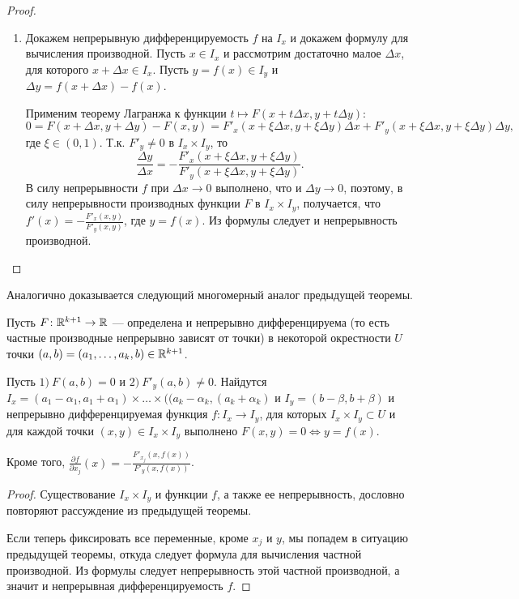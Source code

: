 \documentclass[a4paper]{article}
\theoremstyle{named}
\begin{document}
\begin{proof}
\begin{enumerate}
        \item
            Докажем непрерывную дифференцируемость $f$ на $I_x$ и докажем формулу для вычисления производной. Пусть $x\in I_x$ и рассмотрим достаточно малое $\Delta x$, для которого $x+\Delta x\in I_x$. Пусть $y=f(x)\in I_y$ и $\Delta y= f(x+\Delta x) - f(x)$.

            Применим теорему Лагранжа к функции $t\mapsto F(x+t\Delta x, y+t\Delta y)$:
            $$
                0 
                = F(x+\Delta x, y+\Delta y) - F(x,y)
                = F'_x(x+\xi\Delta x, y+\xi\Delta y)\Delta x + F'_y(x+\xi\Delta x, y+\xi\Delta y)\Delta y,
            $$
            где $\xi\in(0,1)$. Т.к. $F'_y\ne0$ в $I_x\times I_y$,
            то
            $$
                \frac{\Delta y}{\Delta x} = -\frac{F'_x(x+\xi\Delta x, y+\xi\Delta y)}{F'_y(x+\xi\Delta x, y+\xi\Delta y)}.
            $$
            В силу непрерывности $f$ при $\Delta x\to 0$ выполнено, что и $\Delta y\to 0$, поэтому, в силу непрерывности производных функции $F$ в $I_x\times I_y$, получается, что $f'(x) = -\frac{F'_x(x,y)}{F'_y(x,y)}$, где $y=f(x)$. Из формулы следует и непрерывность производной.
        \end{enumerate}
    \end{proof}

    Аналогично доказывается следующий многомерный аналог предыдущей теоремы.

    \begin{theorem*}
        Пусть $F\colon \mathbb{R}^{k+1}\to \mathbb{R}$ --- определена и непрерывно дифференцируема (то есть частные производные непрерывно зависят от точки) в некоторой окрестности $U$ точки $(a,b)=(a_1,\ldots, a_k,b)\in \mathbb{R}^{k+1}$.

        Пусть $1)\ F(a,b)=0$ и  $2)\ F'_y(a,b)\ne0$. Найдутся $I_x = (a_1-\alpha_1, a_1+\alpha_1)\times\ldots\times ((a_k-\alpha_k, (a_k+\alpha_k)$ и $I_y=(b-\beta, b+\beta)$ и непрерывно дифференцируемая функция $f\colon I_x\to I_y$, для которых $I_x\times I_y\subset U$ и для каждой точки $(x,y)\in I_x\times I_y$ выполнено $F(x,y)=0 \Leftrightarrow y=f(x)$. 

        Кроме того, $\frac{\partial f}{\partial x_j}(x)=-\frac{F'_{x_j}(x,f(x))}{F'_y(x,f(x))}$.
    \end{theorem*}

    \begin{proof}
        Существование $I_x\times I_y$ и функции $f$, а также ее непрерывность, дословно повторяют рассуждение из предыдущей теоремы.

        Если теперь фиксировать все переменные, кроме $x_j$ и $y$, мы попадем в ситуацию предыдущей теоремы, откуда следует формула для вычисления частной производной. Из формулы следует непрерывность этой частной производной, а значит и непрерывная дифференцируемость $f$.
    \end{proof}
\end{document}
